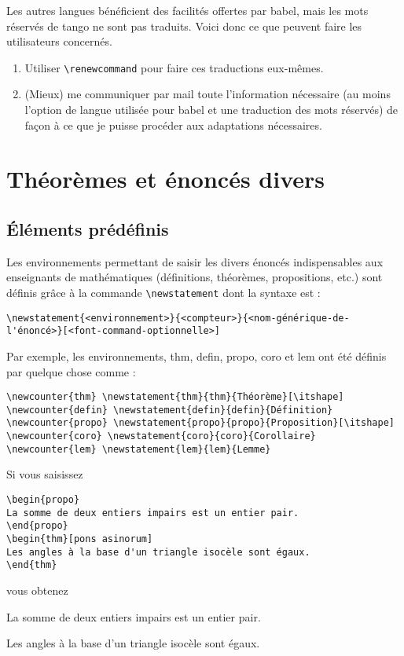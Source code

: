 \documentclass[french,ColorTheme=USAF,FontSize=10pt]{tango}
\newcommand\TO[1]{\textsf{#1}}
\begin{document}
Les autres langues bénéficient des facilités offertes par babel, mais les mots réservés de tango ne sont pas traduits.
Voici donc ce que peuvent faire les utilisateurs concernés.
\begin{enumerate}
\item Utiliser  \verb+\renewcommand+ pour faire ces traductions eux-mêmes.
\item (Mieux) me communiquer par mail toute l'information nécessaire (au moins l'option de langue utilisée pour babel et une traduction des mots réservés) de façon à ce que je puisse procéder aux adaptations nécessaires.
\end{enumerate}

\section{Théorèmes et énoncés divers}\label{st-section}

\subsection{Éléments prédéfinis}
Les environnements permettant de saisir les divers énoncés indispensables aux enseignants de mathématiques (définitions, théorèmes, propositions, etc.) sont définis grâce à la commande \verb+\newstatement+ dont la syntaxe est :
\begin{tcolorbox}
\begin{verbatim}
\newstatement{<environnement>}{<compteur>}{<nom-générique-de-l'énoncé>}[<font-command-optionnelle>]
\end{verbatim}
\end{tcolorbox}
Par exemple, les environnements, \TO{thm}, \TO{defin}, \TO{propo}, \TO{coro} et \TO{lem} ont été définis par quelque chose comme :
\begin{tcolorbox}
\begin{verbatim}
\newcounter{thm} \newstatement{thm}{thm}{Théorème}[\itshape]
\newcounter{defin} \newstatement{defin}{defin}{Définition}
\newcounter{propo} \newstatement{propo}{propo}{Proposition}[\itshape]
\newcounter{coro} \newstatement{coro}{coro}{Corollaire}
\newcounter{lem} \newstatement{lem}{lem}{Lemme}
\end{verbatim}
\end{tcolorbox}

Si vous saisissez
%
\begin{tcolorbox}
\begin{verbatim}
\begin{propo}
La somme de deux entiers impairs est un entier pair.
\end{propo}
\begin{thm}[pons asinorum]
Les angles à la base d'un triangle isocèle sont égaux.
\end{thm}
\end{verbatim}
\end{tcolorbox}
%
vous obtenez
\begin{propo}
La somme de deux entiers impairs est un entier pair.
\end{propo}
\begin{thm}
Les angles à la base d'un triangle isocèle sont égaux.
\end{thm}
\end{document}
